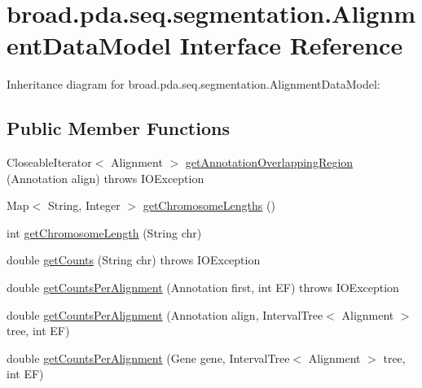\hypertarget{interfacebroad_1_1pda_1_1seq_1_1segmentation_1_1_alignment_data_model}{\section{broad.\+pda.\+seq.\+segmentation.\+Alignment\+Data\+Model Interface Reference}
\label{interfacebroad_1_1pda_1_1seq_1_1segmentation_1_1_alignment_data_model}
}


Inheritance diagram for broad.\+pda.\+seq.\+segmentation.\+Alignment\+Data\+Model\+:
\subsection*{Public Member Functions}
\begin{DoxyCompactItemize}
\item 
Closeable\+Iterator$<$ Alignment $>$ \hyperlink{interfacebroad_1_1pda_1_1seq_1_1segmentation_1_1_alignment_data_model_a2007c077986e1cbc0b656ad30e2c7b50}{get\+Annotation\+Overlapping\+Region} (Annotation align)  throws I\+O\+Exception
\item 
Map$<$ String, Integer $>$ \hyperlink{interfacebroad_1_1pda_1_1seq_1_1segmentation_1_1_alignment_data_model_acac093d995c75987a65f4e44151a11e8}{get\+Chromosome\+Lengths} ()
\item 
int \hyperlink{interfacebroad_1_1pda_1_1seq_1_1segmentation_1_1_alignment_data_model_a36c6800345f6dd84eade58ce23662dfe}{get\+Chromosome\+Length} (String chr)
\item 
double \hyperlink{interfacebroad_1_1pda_1_1seq_1_1segmentation_1_1_alignment_data_model_a2119f620f0e7c5e9a784caa028b15131}{get\+Counts} (String chr)  throws I\+O\+Exception
\item 
double \hyperlink{interfacebroad_1_1pda_1_1seq_1_1segmentation_1_1_alignment_data_model_a0eccb07bd96e7c6ba718bfd87aaaad1f}{get\+Counts\+Per\+Alignment} (Annotation first, int E\+F)  throws I\+O\+Exception
\item 
double \hyperlink{interfacebroad_1_1pda_1_1seq_1_1segmentation_1_1_alignment_data_model_a3d939e89b3cf6e559177a5552a4654d9}{get\+Counts\+Per\+Alignment} (Annotation align, Interval\+Tree$<$ Alignment $>$ tree, int E\+F)
\item 
double \hyperlink{interfacebroad_1_1pda_1_1seq_1_1segmentation_1_1_alignment_data_model_a461ef0912544d8586fa8a9e3d0535ee8}{get\+Counts\+Per\+Alignment} (Gene gene, Interval\+Tree$<$ Alignment $>$ tree, int E\+F)

\end{DoxyCompactItemize}
